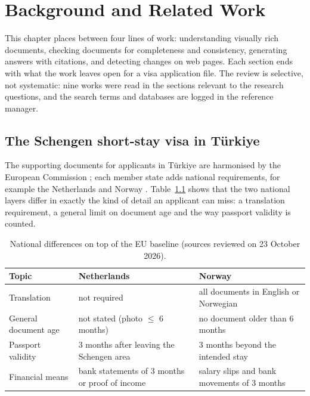 \chapter{Background and Related Work}\label{ch:background}

This chapter places \project{} between four lines of work: understanding visually rich
documents, checking documents for completeness and consistency, generating answers with
citations, and detecting changes on web pages. Each section ends with what the work leaves open
for a visa application file. The review is selective, not systematic: nine works were read in
the sections relevant to the research questions, and the search terms and databases are logged
in the reference manager.

\section{The Schengen short-stay visa in Türkiye}
The supporting documents for applicants in Türkiye are harmonised by the European Commission
\autocite{eu2021harmonised}; each member state adds national requirements, for example the
Netherlands \autocite{nl2025checklist} and Norway \autocite{no2025checklist}.
Table~\ref{tab:nl-no} shows that the two national layers differ in exactly the kind of detail an
applicant can miss: a translation requirement, a general limit on document age and the way
passport validity is counted.

\begin{table}[ht]
  \centering
  \caption{National differences on top of the EU baseline (sources reviewed on 23 October 2026).}
  \label{tab:nl-no}
  \begin{tabularx}{\textwidth}{@{}lXX@{}}
    \toprule
    Topic & Netherlands & Norway \\
    \midrule
    Translation & not required & all documents in English or Norwegian \\
    General document age & not stated (photo $\leq$ 6 months) & no document older than 6 months \\
    Passport validity & 3 months after leaving the Schengen area & 3 months beyond the intended stay \\
    Financial means & bank statements of 3 months or proof of income & salary slips and bank movements of 3 months \\
    \bottomrule
  \end{tabularx}
\end{table}

